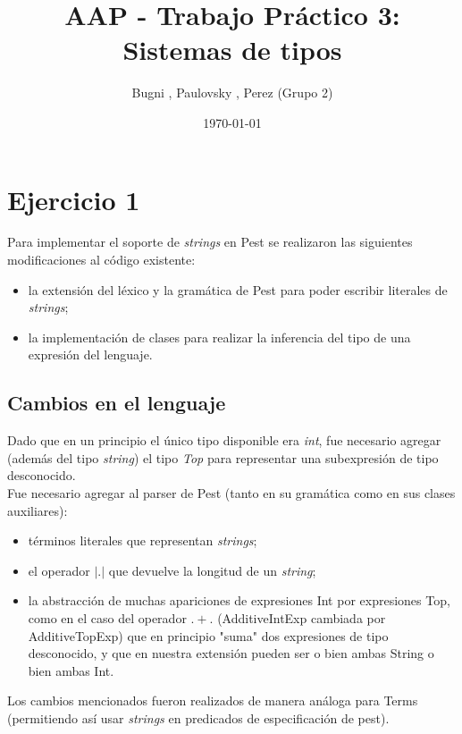 \documentclass[a4paper]{article}
\begin{document}
\title{AAP - Trabajo Práctico 3: Sistemas de tipos}
\date{\today}

\author{Bugni , Paulovsky , Perez (Grupo 2)}

\maketitle

\section{Ejercicio 1}

Para implementar el soporte de \emph{strings} en Pest se realizaron las siguientes modificaciones al código existente:

\begin{itemize}
\item la extensión del léxico y la gramática de Pest para poder escribir literales de \emph{strings};
\item la implementación de clases para realizar la inferencia del tipo de una expresión del lenguaje.
\end{itemize}

\subsection{Cambios en el lenguaje}

Dado que en un principio el único tipo disponible era \emph{int}, fue necesario agregar (además del tipo \emph{string}) el tipo \emph{Top} para representar una subexpresión de tipo desconocido. 
\\

Fue necesario agregar al parser de Pest (tanto en su gramática como en sus clases auxiliares):

\begin{itemize}
\item términos literales que representan \emph{strings};
\item el operador $|.|$ que devuelve la longitud de un \emph{string};
\item la abstracción de muchas apariciones de expresiones Int por expresiones Top, como en el caso del operador $.+.$ (AdditiveIntExp cambiada por AdditiveTopExp) que en principio "suma" dos expresiones de tipo desconocido, y que en nuestra extensión pueden ser o bien ambas String o bien ambas Int.
\end{itemize}

Los cambios mencionados fueron realizados de manera análoga para Terms (permitiendo así usar \emph{strings} en predicados de especificación de pest).
\end{document}
